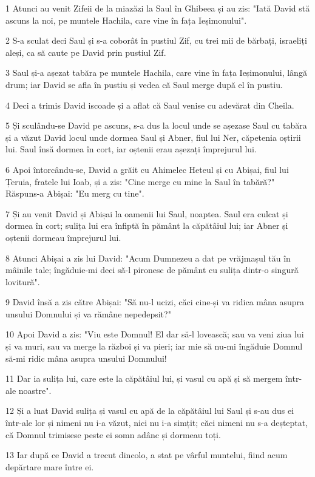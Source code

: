 \par 1 Atunci au venit Zifeii de la miazăzi la Saul în Ghibeea și au zis: "Iată David stă ascuns la noi, pe muntele Hachila, care vine în fața Ieșimonului".
\par 2 S-a sculat deci Saul și s-a coborât în pustiul Zif, cu trei mii de bărbați, israeliți aleși, ca să caute pe David prin pustiul Zif.
\par 3 Saul și-a așezat tabăra pe muntele Hachila, care vine în fața Ieșimonului, lângă drum; iar David se afla în pustiu și vedea că Saul merge după el în pustiu.
\par 4 Deci a trimis David iscoade și a aflat că Saul venise cu adevărat din Cheila.
\par 5 Și sculându-se David pe ascuns, s-a dus la locul unde se așezase Saul cu tabăra și a văzut David locul unde dormea Saul și Abner, fiul lui Ner, căpetenia oștirii lui. Saul însă dormea în cort, iar oștenii erau așezați împrejurul lui.
\par 6 Apoi întorcându-se, David a grăit cu Ahimelec Heteul și cu Abișai, fiul lui Țeruia, fratele lui Ioab, și a zis: "Cine merge cu mine la Saul în tabără?" Răspuns-a Abișai: "Eu merg cu tine".
\par 7 Și au venit David și Abișai la oamenii lui Saul, noaptea. Saul era culcat și dormea în cort; sulița lui era înfiptă în pământ la căpătâiul lui; iar Abner și oștenii dormeau împrejurul lui.
\par 8 Atunci Abișai a zis lui David: "Acum Dumnezeu a dat pe vrăjmașul tău în mâinile tale; îngăduie-mi deci să-l pironesc de pământ cu sulița dintr-o singură lovitură".
\par 9 David însă a zis către Abișai: "Să nu-l ucizi, căci cine-și va ridica mâna asupra unsului Domnului și va rămâne nepedepsit?"
\par 10 Apoi David a zis: "Viu este Domnul! El dar să-l lovească; sau va veni ziua lui și va muri, sau va merge la război și va pieri; iar mie să nu-mi îngăduie Domnul să-mi ridic mâna asupra unsului Domnului!
\par 11 Dar ia sulița lui, care este la căpătâiul lui, și vasul cu apă și să mergem într-ale noastre".
\par 12 Și a luat David sulița și vasul cu apă de la căpătâiul lui Saul și s-au dus ei într-ale lor și nimeni nu i-a văzut, nici nu i-a simțit; căci nimeni nu s-a deșteptat, că Domnul trimisese peste ei somn adânc și dormeau toți.
\par 13 Iar după ce David a trecut dincolo, a stat pe vârful muntelui, fiind acum depărtare mare între ei.
